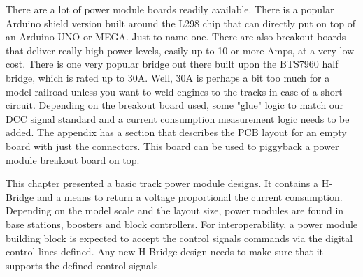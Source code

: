 There are a lot of power module boards readily available. There is a popular Arduino shield version built around the L298 chip that can directly put on top of an Arduino UNO or MEGA. Just to name one. There are also breakout boards that deliver really high power levels, easily up to 10 or more Amps, at a very low cost. There is one very popular bridge out there built upon the BTS7960 half bridge, which is rated up to 30A. Well, 30A is perhaps a bit too much for a model railroad unless you want to weld engines to the tracks in case of a short circuit. Depending on the breakout board used, some "glue" logic to match our DCC signal standard and a current consumption measurement logic needs to be added. The appendix has a section that describes the PCB layout for an empty board with just the connectors. This board can be used to piggyback a power module breakout board on top.


This chapter presented a basic track power module designs. It contains a H-Bridge and a means to return a voltage proportional the current consumption. Depending on the model scale and the layout size, power modules are found in base stations, boosters and block controllers. For interoperability, a power module building block is expected to accept the control signals commands via the digital control lines defined. Any new H-Bridge design needs to make sure that it supports the defined control signals.
